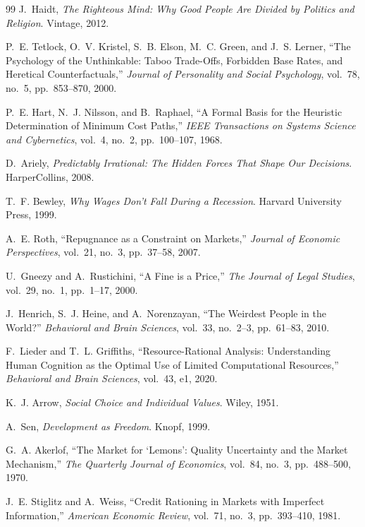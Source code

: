 \documentclass[12pt]{article}
\theoremstyle{definition}
\theoremstyle{remark}
\begin{document}
\begin{thebibliography}{99}
J.~Haidt, \emph{The Righteous Mind: Why Good People Are Divided by Politics and Religion}. Vintage, 2012.

P.~E. Tetlock, O.~V. Kristel, S.~B. Elson, M.~C. Green, and J.~S. Lerner, ``The Psychology of the Unthinkable: Taboo Trade-Offs, Forbidden Base Rates, and Heretical Counterfactuals,'' \emph{Journal of Personality and Social Psychology}, vol.~78, no.~5, pp.~853--870, 2000.

P.~E. Hart, N.~J. Nilsson, and B.~Raphael, ``A Formal Basis for the Heuristic Determination of Minimum Cost Paths,'' \emph{IEEE Transactions on Systems Science and Cybernetics}, vol.~4, no.~2, pp.~100--107, 1968.

D.~Ariely, \emph{Predictably Irrational: The Hidden Forces That Shape Our Decisions}. HarperCollins, 2008.

T.~F. Bewley, \emph{Why Wages Don't Fall During a Recession}. Harvard University Press, 1999.

A.~E. Roth, ``Repugnance as a Constraint on Markets,'' \emph{Journal of Economic Perspectives}, vol.~21, no.~3, pp.~37--58, 2007.

U.~Gneezy and A.~Rustichini, ``A Fine is a Price,'' \emph{The Journal of Legal Studies}, vol.~29, no.~1, pp.~1--17, 2000.

J.~Henrich, S.~J. Heine, and A.~Norenzayan, ``The Weirdest People in the World?'' \emph{Behavioral and Brain Sciences}, vol.~33, no.~2--3, pp.~61--83, 2010.

F.~Lieder and T.~L. Griffiths, ``Resource-Rational Analysis: Understanding Human Cognition as the Optimal Use of Limited Computational Resources,'' \emph{Behavioral and Brain Sciences}, vol.~43, e1, 2020.

K.~J. Arrow, \emph{Social Choice and Individual Values}. Wiley, 1951.

A.~Sen, \emph{Development as Freedom}. Knopf, 1999.

G.~A. Akerlof, ``The Market for `Lemons': Quality Uncertainty and the Market Mechanism,'' \emph{The Quarterly Journal of Economics}, vol.~84, no.~3, pp.~488--500, 1970.

J.~E. Stiglitz and A.~Weiss, ``Credit Rationing in Markets with Imperfect Information,'' \emph{American Economic Review}, vol.~71, no.~3, pp.~393--410, 1981.


\end{thebibliography}
\end{document}
